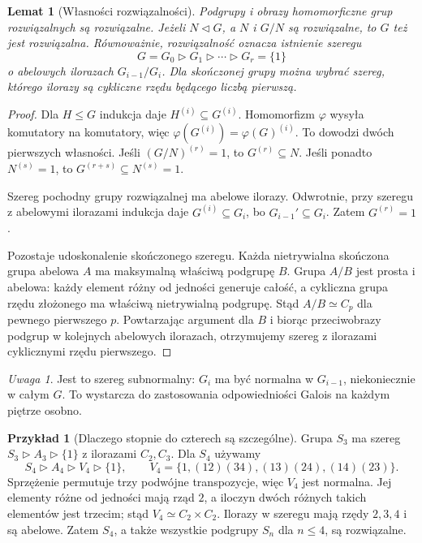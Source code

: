 \documentclass[11pt,a4paper,oneside]{book}
\numberwithin{equation}{section}
\theoremstyle{plain}
\newtheorem{lemat}[twierdzenie]{Lemat}
\theoremstyle{definition}
\newtheorem{przyklad}[twierdzenie]{Przykład}
\theoremstyle{remark}
\newtheorem{uwaga}[twierdzenie]{Uwaga}
\begin{document}
\begin{lemat}[Własności rozwiązalności]
Podgrupy i obrazy homomorficzne grup rozwiązalnych są rozwiązalne. Jeżeli $N\triangleleft G$, a $N$ i $G/N$ są rozwiązalne, to $G$ też jest rozwiązalna. Równoważnie, rozwiązalność oznacza istnienie szeregu
\[
G=G_0\triangleright G_1\triangleright\cdots\triangleright G_r=\{1\}
\]
o abelowych ilorazach $G_{i-1}/G_i$. Dla skończonej grupy można wybrać szereg, którego ilorazy są cykliczne rzędu będącego liczbą pierwszą.
\end{lemat}
\begin{proof}
Dla $H\le G$ indukcja daje $H^{(i)}\subseteq G^{(i)}$. Homomorfizm $\varphi$ wysyła komutatory na komutatory, więc $\varphi(G^{(i)})=\varphi(G)^{(i)}$. To dowodzi dwóch pierwszych własności. Jeśli $(G/N)^{(r)}=1$, to $G^{(r)}\subseteq N$. Jeśli ponadto $N^{(s)}=1$, to $G^{(r+s)}\subseteq N^{(s)}=1$.

Szereg pochodny grupy rozwiązalnej ma abelowe ilorazy. Odwrotnie, przy szeregu z abelowymi ilorazami indukcja daje $G^{(i)}\subseteq G_i$, bo $G_{i-1}'\subseteq G_i$. Zatem $G^{(r)}=1$.

Pozostaje udoskonalenie skończonego szeregu. Każda nietrywialna skończona grupa abelowa $A$ ma maksymalną właściwą podgrupę $B$. Grupa $A/B$ jest prosta i abelowa: każdy element różny od jedności generuje całość, a cykliczna grupa rzędu złożonego ma właściwą nietrywialną podgrupę. Stąd $A/B\simeq C_p$ dla pewnego pierwszego $p$. Powtarzając argument dla $B$ i biorąc przeciwobrazy podgrup w kolejnych abelowych ilorazach, otrzymujemy szereg z ilorazami cyklicznymi rzędu pierwszego.
\end{proof}

\begin{uwaga}
Jest to szereg subnormalny: $G_i$ ma być normalna w $G_{i-1}$, niekoniecznie w całym $G$. To wystarcza do zastosowania odpowiedniości Galois na każdym piętrze osobno.
\end{uwaga}

\begin{przyklad}[Dlaczego stopnie do czterech są szczególne]
Grupa $S_3$ ma szereg $S_3\triangleright A_3\triangleright\{1\}$ z ilorazami $C_2,C_3$. Dla $S_4$ używamy
\[
S_4\triangleright A_4\triangleright V_4\triangleright\{1\},\qquad
V_4=\{1,(12)(34),(13)(24),(14)(23)\}.
\]
Sprzężenie permutuje trzy podwójne transpozycje, więc $V_4$ jest normalna. Jej elementy różne od jedności mają rząd $2$, a iloczyn dwóch różnych takich elementów jest trzecim; stąd $V_4\simeq C_2\times C_2$. Ilorazy w szeregu mają rzędy $2,3,4$ i są abelowe. Zatem $S_4$, a także wszystkie podgrupy $S_n$ dla $n\le4$, są rozwiązalne.
\end{przyklad}
\end{document}
